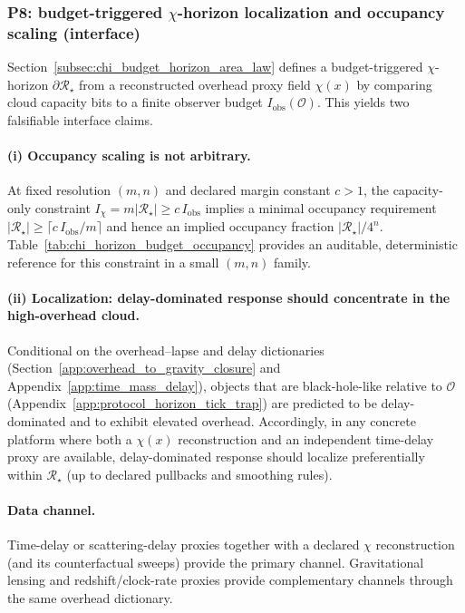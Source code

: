 \subsubsection{P8: budget-triggered \texorpdfstring{$\chi$}{chi}-horizon localization and occupancy scaling (interface)}
\label{subsec:p8_chi_horizon_budget}

Section~\ref{subsec:chi_budget_horizon_area_law} defines a budget-triggered $\chi$-horizon $\partial\mathcal R_\star$ from a reconstructed overhead proxy field $\chi(x)$ by comparing cloud capacity bits to a finite observer budget $I_{\mathrm{obs}}(\mathcal O)$.
This yields two falsifiable interface claims.

\paragraph{(i) Occupancy scaling is not arbitrary.}
At fixed resolution $(m,n)$ and declared margin constant $c>1$, the capacity-only constraint
$I_{\chi}=m|\mathcal R_\star|\ge c\,I_{\mathrm{obs}}$ implies a minimal occupancy requirement
$|\mathcal R_\star|\ge \lceil c\,I_{\mathrm{obs}}/m\rceil$ and hence an implied occupancy fraction $|\mathcal R_\star|/4^n$.
Table~\ref{tab:chi_horizon_budget_occupancy} provides an auditable, deterministic reference for this constraint in a small $(m,n)$ family.

\paragraph{(ii) Localization: delay-dominated response should concentrate in the high-overhead cloud.}
Conditional on the overhead--lapse and delay dictionaries (Section~\ref{app:overhead_to_gravity_closure} and Appendix~\ref{app:time_mass_delay}),
objects that are black-hole-like relative to $\mathcal O$ (Appendix~\ref{app:protocol_horizon_tick_trap}) are predicted to be delay-dominated and to exhibit elevated overhead.
Accordingly, in any concrete platform where both a $\chi(x)$ reconstruction and an independent time-delay proxy are available, delay-dominated response should localize preferentially within $\mathcal R_\star$ (up to declared pullbacks and smoothing rules).

\paragraph{Data channel.}
Time-delay or scattering-delay proxies together with a declared $\chi$ reconstruction (and its counterfactual sweeps) provide the primary channel.
Gravitational lensing and redshift/clock-rate proxies provide complementary channels through the same overhead dictionary.

